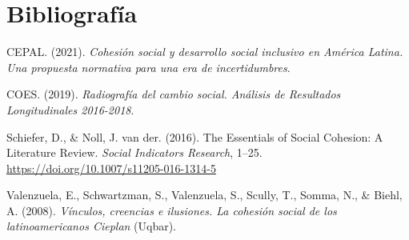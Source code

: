 \documentclass[
  12pt,
]{book}
\begin{document}
\hypertarget{bibliografuxeda}{%
\chapter*{Bibliografía}\label{bibliografuxeda}}

\hypertarget{refs}{}
\leavevmode\hypertarget{ref-cepal_cohesion_2021}{}%
CEPAL. (2021). \emph{Cohesión social y desarrollo social inclusivo en América Latina. Una propuesta normativa para una era de incertidumbres}.

\leavevmode\hypertarget{ref-coes_radiografia_2019}{}%
COES. (2019). \emph{Radiografía del cambio social. Análisis de Resultados Longitudinales 2016-2018}.

\leavevmode\hypertarget{ref-schiefer_essentials_2016}{}%
Schiefer, D., \& Noll, J. van der. (2016). The Essentials of Social Cohesion: A Literature Review. \emph{Social Indicators Research}, 1--25. \url{https://doi.org/10.1007/s11205-016-1314-5}

\leavevmode\hypertarget{ref-valenzuela_vinculos_2008}{}%
Valenzuela, E., Schwartzman, S., Valenzuela, S., Scully, T., Somma, N., \& Biehl, A. (2008). \emph{Vínculos, creencias e ilusiones. La cohesión social de los latinoamericanos Cieplan} (Uqbar).
\end{document}
